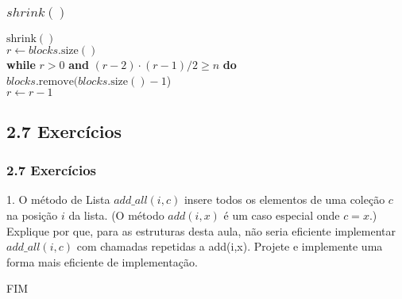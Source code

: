 \documentclass{beamer}
\begin{document}
\begin{frame}
\frametitle{$shrink()$}
\begin{oframed}
\begin{flushleft}
\hspace*{1em} \ensuremath{\mathrm{shrink}()}\\
\hspace*{1em} \hspace*{1em} \ensuremath{\ensuremath{\mathit{r}} \gets  \ensuremath{\ensuremath{\mathit{blocks}}.\mathrm{size}()}}\\
\hspace*{1em} \hspace*{1em} {\color{black} \textbf{while}} \ensuremath{\ensuremath{\mathit{r}} > 0} {\color{black} \textbf{and}} \ensuremath{(\ensuremath{\mathit{r}}-2)\cdot (\ensuremath{\mathit{r}}-1)/2 \ge n} {\color{black} \textbf{do}} \\
\hspace*{1em} \hspace*{1em} \hspace*{1em} \ensuremath{\ensuremath{\mathit{blocks}}.\mathrm{remove}(\ensuremath{\mathit{blocks}}.\mathrm{size}()-1})\\
\hspace*{1em} \hspace*{1em} \hspace*{1em} \ensuremath{\ensuremath{\mathit{r}} \gets  \ensuremath{\ensuremath{\mathit{r}} - 1}}\\
\end{flushleft}
\end{oframed}
\end{frame}

\subsection{2.7 Exercícios}
\begin{frame}
\frametitle{2.7 Exercícios}
1. O método de Lista $add\_all(i,c)$ insere todos os elementos de uma coleção $c$ na posição $i$  da lista.  (O método $add(i,x)$ é um caso especial onde $c=x$.)  Explique por que, para as estruturas desta aula, não seria eficiente implementar $add\_all(i,c)$ com chamadas repetidas a add(i,x).  Projete e implemente uma forma mais eficiente de implementação.
\end{frame}



\begin{frame}
FIM
\end{frame}
\end{document}
